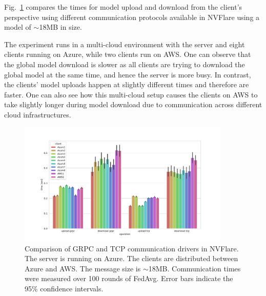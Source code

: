 \documentclass[11pt]{article}
\begin{document}
Fig.~\ref{fig:cloud_comm} compares the times for model upload and download from the client's perspective using different communication protocols available in NVFlare using a model of $\sim$18MB in size.

The experiment runs in a multi-cloud environment with the server and eight clients running on Azure, while two clients run on AWS. One can observe that the global model download is slower as all clients are trying to download the global model at the same time, and hence the server is more busy. In contrast, the clients' model uploads happen at slightly different times and therefore are faster. One can also see how this multi-cloud setup causes the clients on AWS to take slightly longer during model download due to communication across different cloud infrastructures.

\begin{figure}[htbp]
    \centering
    \includegraphics[width=0.90\textwidth]{submissions/HolgerRoth/fig/comm_protocols1.pdf}
    \caption{Comparison of GRPC and TCP communication drivers in NVFlare. The server is running on Azure. The clients are distributed between Azure and AWS. The message size is $\sim$18MB. Communication times were measured over 100 rounds of FedAvg. Error bars indicate the 95\% confidence intervals. \label{fig:cloud_comm}}
\end{figure}
\end{document}
